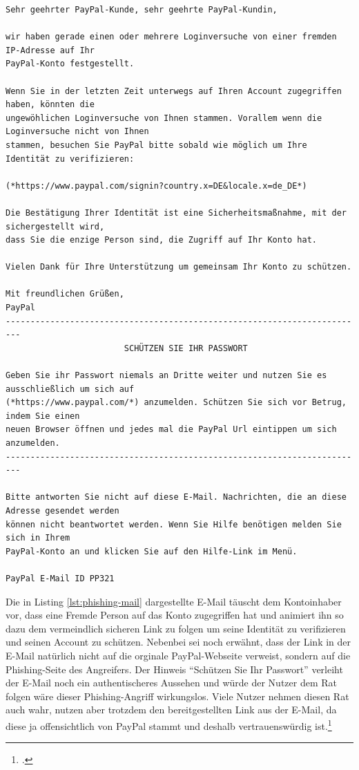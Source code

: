 \begin{scriptsize}
\begin{lstlisting}
Sehr geehrter PayPal-Kunde, sehr geehrte PayPal-Kundin,

wir haben gerade einen oder mehrere Loginversuche von einer fremden IP-Adresse auf Ihr
PayPal-Konto festgestellt.

Wenn Sie in der letzten Zeit unterwegs auf Ihren Account zugegriffen haben, könnten die
ungewöhlichen Loginversuche von Ihnen stammen. Vorallem wenn die Loginversuche nicht von Ihnen
stammen, besuchen Sie PayPal bitte sobald wie möglich um Ihre Identität zu verifizieren:

(*https://www.paypal.com/signin?country.x=DE&locale.x=de_DE*)

Die Bestätigung Ihrer Identität ist eine Sicherheitsmaßnahme, mit der sichergestellt wird,
dass Sie die enzige Person sind, die Zugriff auf Ihr Konto hat.

Vielen Dank für Ihre Unterstützung um gemeinsam Ihr Konto zu schützen.

Mit freundlichen Grüßen,
PayPal
-------------------------------------------------------------------------
                        SCHÜTZEN SIE IHR PASSWORT

Geben Sie ihr Passwort niemals an Dritte weiter und nutzen Sie es ausschließlich um sich auf
(*https://www.paypal.com/*) anzumelden. Schützen Sie sich vor Betrug, indem Sie einen
neuen Browser öffnen und jedes mal die PayPal Url eintippen um sich anzumelden.
-------------------------------------------------------------------------

Bitte antworten Sie nicht auf diese E-Mail. Nachrichten, die an diese Adresse gesendet werden
können nicht beantwortet werden. Wenn Sie Hilfe benötigen melden Sie sich in Ihrem
PayPal-Konto an und klicken Sie auf den Hilfe-Link im Menü.

PayPal E-Mail ID PP321
\end{lstlisting}
\end{scriptsize}

Die in Listing \ref{lst:phishing-mail} dargestellte E-Mail täuscht dem Kontoinhaber vor, dass eine
Fremde Person auf das Konto zugegriffen hat und animiert ihn so dazu dem vermeindlich sicheren Link
zu folgen um seine Identität zu verifizieren und seinen Account zu schützen. Nebenbei sei noch
erwähnt, dass der Link in der E-Mail natürlich nicht auf die orginale PayPal-Webseite verweist,
sondern auf die Phishing-Seite des Angreifers. Der Hinweis \enquote{Schützen Sie Ihr Passwort}
verleiht der E-Mail noch ein authentischeres Aussehen und würde der Nutzer dem Rat folgen wäre
dieser Phishing-Angriff wirkungslos. Viele Nutzer nehmen diesen Rat auch wahr, nutzen aber trotzdem
den bereitgestellten Link aus der E-Mail, da diese ja offensichtlich von PayPal stammt und deshalb
vertrauenswürdig ist.\footcite[Vgl.][10]{phishing}

